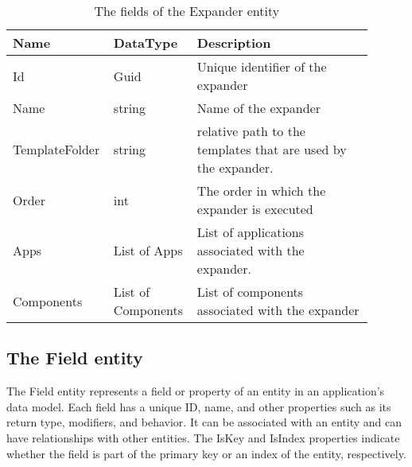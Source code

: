 \begin{table}[H]
\small
\begin{tabular}{ p{0.20\linewidth} p{0.22\linewidth} p{0.48\linewidth} }
\hline
\textbf{Name} & \textbf{DataType} & \textbf{Description} \\
\hline
Id & Guid & Unique identifier of the expander \\
Name & string & Name of the expander \\
TemplateFolder & string & relative path to the templates that are used by the expander. \\
Order & int & The order in which the expander is executed \\
Apps & List of Apps & List of applications associated with the expander. \\
Components & List of Components & List of components associated with the expander \\
\hline
\end{tabular}
\caption{The fields of the Expander entity}
\label{table:expander_entity}
\end{table}

\subsection{The Field entity}

The Field entity represents a field or property of an entity in an application's data
model. Each field has a unique ID, name, and other properties such as its return type,
modifiers, and behavior. It can be associated with an entity and can have relationships
with other entities. The IsKey and IsIndex properties indicate whether the field is part
of the primary key or an index of the entity, respectively.

